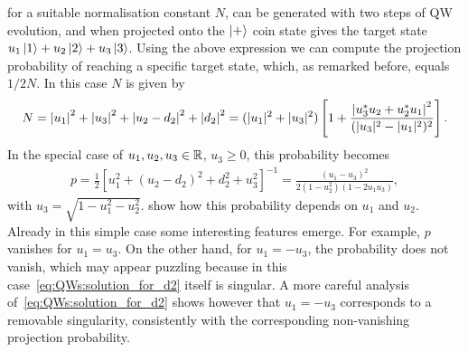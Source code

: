 for a suitable normalisation constant $N$,
can be generated with two steps of \ac{QW} evolution, and when projected onto the $\ket+$ coin state gives the target state $u_1\ket1+u_2\ket2+u_3\ket3$.
Using the above expression we can compute the projection probability of reaching a specific target state, which, as remarked before, equals $1/2N$.
In this case $N$ is given by
\begin{equation}
\begin{aligned}
    N =
    \abs{u_1}^2 +\abs{u_3}^2 + \abs{u_2-d_2}^2 + \abs{d_2}^2 =
    (\lvert u_1\rvert^2 +\lvert u_3\rvert^2)\left[
        1 +
        \frac{
            \abs{u_3^* u_2 + u_2^* u_1}^2
        }{(\lvert u_3\rvert^2-\lvert u_1\rvert^2)^2}
\right].
\end{aligned}
\end{equation}
In the special case of $u_1, u_2, u_3 \in {\mathbb{R}}$, $u_3 \ge 0$, this probability becomes
\begin{equation}
\begin{aligned}
	p = \frac{1}{2} \left[ u_1^2 + (u_2 - d_2)^2 + d_2^2 + u_3^2 \right]^{-1}
	= \frac{
		\left( u_1 - u_3 \right)^2
	}{
		2(1 - u_2^2)(1 - 2 u_1 u_3)
	},
\end{aligned}
\label{eq:proj_prob_2steps}
\end{equation}
with $u_3 = \sqrt{1 - u_1^2 - u_2^2}$.
 show how this probability depends on $u_1$ and $u_2$.
Already in this simple case some interesting features emerge. For example, $p$ vanishes for $u_1 = u_3$.
On the other hand, for $u_1 = -u_3$, the probability does not vanish, which may appear puzzling because in this case~\cref{eq:QWs:solution_for_d2} itself is singular.
A more careful analysis of~\cref{eq:QWs:solution_for_d2} shows however that $u_1 = -u_3$ corresponds to a removable singularity, consistently with the corresponding non-vanishing projection probability.

